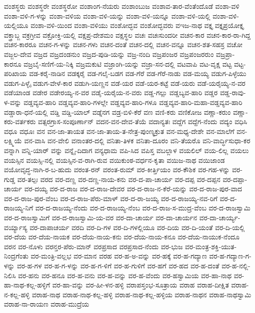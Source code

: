 ವಂಶಸ್ಥರು
ವಂಶಸ್ಥರೇ
ವಂಶಸ್ಥರೋ
ವಂಶಾಂಗ-ನೆಯರು
ವಂಶಾಂಬುಜ
ವಂಶಾವ-ತಾರ-ವೆಂತೆಂದೊಡೆ
ವಂಶಾ-ವಳಿ
ವಂಶಾ-ವಳಿ-ಗ-ಳನ್ನು
ವಂಶಾ-ವಳಿಯ
ವಂಶಾ-ವಳಿ-ಯನ್ನು
ವಂಶಾ-ವಳಿ-ಯನ್ನೂ
ವಂಶಾ-ವಳಿ-ಯಲ್ಲಿ
ವಂಶಾ-ವಳಿ-ಯಲ್ಲಿಯೂ
ವಂಶಾ-ವಳಿ-ಯಿಂದ
ವಂಶಾ-ವಳಿಯು
ವಂಶೋದ್ಭವ
ವಂಶೋದ್ಭವರು
ವಇಜ-ನಾಥ
ವಕ್ತೃ
ವಕ್ತೃಪ್ರಯೋಕ್ತೃ
ವಕ್ತ್ರಾಬ್ಜ
ವಕ್ರಗ್ರೀವ
ವಕ್ರೋಕ್ತಿ-ಯಲ್ಲಿ
ವಕ್ಷಪ್ರ-ದೇಶಮಂ
ವಕ್ಷಸ್ಥಲ
ವಚಃ
ವಚಃಸುಂದರೀ
ವಚನ-ಕಾರ
ವಚನ-ಕಾರ-ರಾ-ಗಿದ್ದ
ವಚನ-ಕಾರರೂ
ವಚನ-ಗ-ಳನ್ನು
ವಚನ-ಗಳು
ವಚನ-ದಂತೆ
ವಚನ-ದಲ್ಲಿ
ವಚನ-ವನ್ನೂ
ವಚನ-ಶತ-ಸಹಸ್ರ
ವಚೋ
ವಜ್ಜಲ-ದೇವ
ವಜ್ರದ
ವಜ್ರದಂಡನುಂ
ವಜ್ರದ-ಪುಡಿ-ಯನ್ನು
ವಜ್ರ-ನಂದಿ
ವಜ್ರಪಂಜರ
ವಜ್ರಪಂಜರರುಂ
ವಜ್ರಪ್ರಾ-ಕಾರನೂ
ವಜ್ರಬೈ-ಸಣಿಗೆ-ಯ-ನಿಕ್ಕಿ
ವಜ್ರಮಕುಟಿ
ವಜ್ರಾಂಗಿ-ಯನ್ನು
ವಜ್ರಾ-ಸನ-ದಲ್ಲಿ
ವಟವಾಪಿ
ವಟ-ವೃಕ್ಷ
ವಟ್ಟ
ವಟ್ಟ-ಪರಿಖಾಯ
ವಡ-ಕರೈ-ನಾಡಿನ
ವಡಕ್ಕರೈ
ವಡ-ಗಲೈ-ಬಡಗ
ವಡ-ಗೆರೆ
ವಡ-ಗೆರೆ-ನಾಡು
ವಡ-ಮಯ್ಯ
ವಡುಗ-ಪಿಳ್ಳೆಯು
ವಡುಗ-ಪಿಳ್ಳೈ
ವಡುಗ-ವೇಳೆ-ಕಾರ
ವಡುಗಿ-ಯಣ್ಣನ
ವಡೆ-ಯರ
ವಡೆ-ಯರ-ಕಟ್ಟೆ
ವಡೆ-ಯರು
ವಡೆ-ಯರೈಯ್ಯ-ನ-ವರ
ವಡೆಯಾಂಡ
ವಡೇರ
ವಡೇರಯ್ಯ-ನ-ವರ
ವಡೈ-ಯರೈಯ-ನ-ವರು
ವಡ್ಡ-ಗಲ್ಲು
ವಡ್ಡಬ್ಯವ-ಹಾರಿ
ವಡ್ಡರ
ವಡ್ಡ-ರಾವು-ಳ-ವನ್ನು
ವಡ್ಡವ್ಯವ-ಹಾರಿ
ವಡ್ಡವ್ಯವ-ಹಾರಿ-ಗಳಲ್ಲೇ
ವಡ್ಡವ್ಯವ-ಹಾರಿ-ಗಳೂ
ವಡ್ಡವ್ಯವ-ಹಾರಿ-ಮಹಾ-ವಡ್ಡವ್ಯವ-ಹಾರಿ
ವಡ್ಡಾರಾ-ಧನೆ-ಯಲ್ಲಿ
ವಡ್ಡಿ
ವಡ್ಡಿ-ಯಾಲ್
ವಡ್ನೆನಗ
ವಡ್ರ-ಬಿಳಿ-ಕೆರೆ
ವಣ
ವಣಿ-ಕರು
ವಣಿಕೋಜ
ವಣ್ಣಾ-ಕರುಂ
ವಣ್ಣಾ-ಕರು-ವರ್ತಕರು
ವತ್ಸರಗ್ರಾಸ-ಸಂಪೂರ್ಣಾನ್
ವದನ-ವನ-ದೇವ-ತೆಯೆ
ವದಾನ್ಯತಃ
ವದ್ದೆಗ
ವದ್ದೆಗ-ನೆಂದು
ವದ್ಯಂ
ವಧಿಸಿ
ವಧೂ
ವಧೂಃ
ವನ
ವನ-ಜಾ-ತಾಯತ
ವನ-ಜಾ-ತಾಯ-ತ-ನೇತ್ರ-ಪುಂಣ್ಯಕ್ರುತ
ವನ-ಮಧ್ಯ-ದೇಶೇ
ವನ-ಮಾಲೆಗೆ
ವನ-ಲಕ್ಷ್ಮಿಯೆ
ವನ-ವಾಸಿ
ವನ-ವೇಲಿ
ವನಾಂತರ-ದಲ್ಲಿ
ವನಿತಾ-ತಿಳಕ
ವನಿತಾ-ದೂರಂ
ವನಿ-ತೆಯರೊ
ವನಿ-ವಾರ್ದ್ಧಿಸುಧಾ-ಕರ
ವನ್ನಾಗಿ
ವನ್ನಿ-ಯಾರ್
ವನ್ನು
ವನ್ನೈ-ದಿದಾಗ
ವನ್ಯಧಾಮ
ವಪಿ-ಸಿದ
ವಪಿಸ್ತ
ವಬಲ್ಲಾಳ
ವಯಲಿಲ್
ವಯ-ಲಿಲ್ಲ
ವಯಲು
ವಯಸ್ಸಿನ
ವಯಸ್ಸಿ-ನಲ್ಲಿ
ವಯಸ್ಸಿನ-ವ-ರಾಗಿ-ರುವ
ವಯಿಕುಂಠ-ವರ್ಧನ-ಕೃತಾ
ವಯಿಜ-ನಾಥ
ವಯಿಜಾಂಡ
ವಯೋವೃದ್ಧ-ನಾಗಿ-ರ-ಬ-ಹುದು
ವರಂತ-ರನ್
ವರಂತ-ರುಮ್
ವರ-ಕೀರ್ತ್ತಿಯಂ
ವರ-ಕೌಶಿಕ
ವರ-ಗಹ-ಳನ್ನು
ವರ-ಗುಡ್ಡ
ವರ-ತಲ್ಪಃ
ವರದ
ವರ-ದಣ್ಣ
ವರ-ದಣ್ಣ-ನಾಯ-ಕನು
ವರ-ದ-ಪಾ-ಚಾರ್ಯ
ವರ-ದಪ್ಪ
ವರ-ದಪ್ಪನ
ವರ-ದಪ್ಪಾ-ಚಾರ್ಯ
ವರ-ದಯ್ಯ
ವರ-ದ-ರಾಜ
ವರ-ದ-ರಾಜ-ದೇವರ
ವರ-ದ-ರಾಜ-ನ-ಕೆರೆ-ಯನ್ನು
ವರ-ದ-ರಾಜ-ಪುರ-ವಾದ
ವರ-ದ-ರಾಜ-ಪುರ-ವೆಂಬ
ವರ-ದ-ರಾಜ-ಪೆರು-ಮಾಳ್
ವರ-ದ-ರಾ-ಜಯ್ಯ
ವರ-ದ-ರಾಜಯ್ಯ-ನವ-ರಿಗೆ
ವರ-ದ-ರಾಜಯ್ಯ-ನಿಗೆ
ವರ-ದ-ರಾಜಯ್ಯ-ನೆಂದು
ವರ-ದ-ರಾಜಯ್ಯ-ನೆಂಬ
ವರ-ದ-ರಾಜ-ಸ-ಮುದ್ರ-ವೆಂಬ
ವರ-ದ-ರಾಜಸ್ವಾಮಿ
ವರ-ದ-ರಾಜಸ್ವಾಮಿಗೆ
ವರ-ದ-ರಾಜಸ್ವಾಮಿ-ಯ-ವರ
ವರ-ದಾ-ಚಾರ್ಯ
ವರ-ದಾ-ಚಾರ್ಯನ
ವರ-ದಾ-ಚಾರ್ಯ್ಯ-ವರ್ಯ್ಯಾಸ್ಯ
ವರ-ದಾಪಾಚರ್ಯ
ವರದಿ
ವರ-ದಿ-ಗಳ
ವರ-ದಿ-ಗಳಲ್ಲಿಯೂ
ವರ-ದಿಯ
ವರ-ದಿ-ಯಂತೆ
ವರ-ದಿ-ಯಲ್ಲಿ
ವರ-ದೆಯ
ವರ-ದೆಯ-ನಾಯಕ
ವರ-ದೆಯ-ನಾಯ-ಕನು
ವರ-ದೆಯ-ನಾಯ-ಕನೂ
ವರ-ದೆಯ-ನಾಯುಕ-ನೆಂದೂ
ವರನ
ವರ-ನೊಳು
ವರನ್ತರ-ಪೆರು-ಮಾನ್
ವರಪ್ರಸಾದ
ವರಪ್ರಸಾದ-ನೆಂದು
ವರ-ಭುಜ
ವರ-ಮಂತ್ರ-ಶಕ್ತಿ-ಯುತ-ನಿಂದ್ರಗೆಂತು
ವರ-ಮಂತ್ರಿ-ವಲ್ಲಭ
ವರ-ಮಾನ
ವರಹ
ವರ-ಹ-ಅ-ವನ್ನು
ವರ-ಹಕ್ಕೆ
ವರ-ಹ-ಗದ್ಯಾಣ
ವರ-ಹ-ಗದ್ಯಾಣ-ಗ-ಳನ್ನು
ವರ-ಹ-ಗಳ
ವರ-ಹ-ಗ-ಳನ್ನು
ವರ-ಹ-ಗ-ಳಿಗೆ
ವರ-ಹ-ಗುಳಿಗೆ
ವರ-ಹಗೆ
ವರ-ಹದ
ವರ-ಹ-ದಂತೆ
ವರ-ಹ-ನಲ್ಲಿ-ನಿಲಿಸಿ
ವರ-ಹನು
ವರ-ಹನೂ
ವರ-ಹ-ವನು
ವರ-ಹ-ವನ್ನು
ವರ-ಹ-ವೆಂದು
ವರ-ಹಸ್ವಾಮಿಯ
ವರ-ಹಾ-ನಾಥ
ವರ-ಹಾ-ನಾಥ-ಕಲ್ಲ-ಹಳ್ಳಿಗೆ
ವರ-ಹಾ-ವನ್ನು
ವರ-ಹೀ-ಳನ-ಹಳ್ಳಿ
ವರಾಪಸ್ತಂಭ-ಸೂತ್ರಾಯ
ವರಾಹ
ವರಾಹ-ದೀಕ್ಷಿತ
ವರಾಹ-ನ-ಕಲ್ಲ-ಹಳ್ಳಿ
ವರಾಹ-ನಾಥ
ವರಾಹ-ನಾಥ-ಕಲ್ಲ-ಹಳ್ಳಿ
ವರಾಹ-ನಾಥ-ಕಲ್ಲ-ಹಳ್ಳಿಯ
ವರಾಹ-ನಾಥನ
ವರಾಹ-ನಾಥಸ್ವಾಮಿ
ವರಾಹ-ನಾ-ರಾಯಣ
ವರಾಹ-ಮುದ್ರೆಯ
